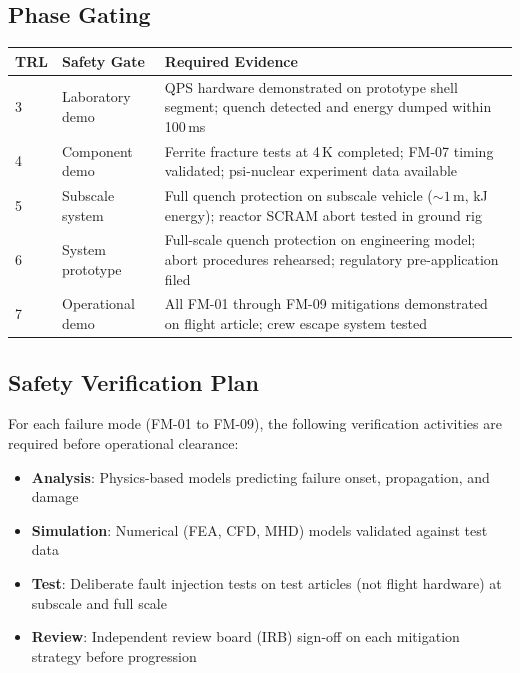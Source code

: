 \documentclass[11pt,a4paper]{article}
\begin{document}
\subsection{Phase Gating}

\begin{longtable}{p{0.10\tw}p{0.18\tw}p{0.62\tw}}
\toprule
\textbf{TRL} & \textbf{Safety Gate} & \textbf{Required Evidence} \\
\midrule
\endhead
3 & Laboratory demo & QPS hardware demonstrated on prototype shell segment;
  quench detected and energy dumped within 100\,ms \\
4 & Component demo & Ferrite fracture tests at 4\,K completed; FM-07 timing
  validated; psi-nuclear experiment data available \\
5 & Subscale system & Full quench protection on subscale vehicle ($\sim 1$\,m,
  kJ energy); reactor SCRAM abort tested in ground rig \\
6 & System prototype & Full-scale quench protection on engineering model;
  abort procedures rehearsed; regulatory pre-application filed \\
7 & Operational demo & All FM-01 through FM-09 mitigations demonstrated
  on flight article; crew escape system tested \\
\bottomrule
\end{longtable}

\subsection{Safety Verification Plan}

For each failure mode (FM-01 to FM-09), the following verification
activities are required before operational clearance:

\begin{itemize}[nosep]
  \item \textbf{Analysis}: Physics-based models predicting failure onset,
    propagation, and damage
  \item \textbf{Simulation}: Numerical (FEA, CFD, MHD) models validated
    against test data
  \item \textbf{Test}: Deliberate fault injection tests on test articles
    (not flight hardware) at subscale and full scale
  \item \textbf{Review}: Independent review board (IRB) sign-off
    on each mitigation strategy before progression
\end{itemize}

\end{document}
